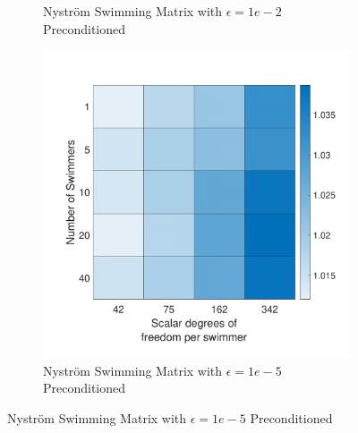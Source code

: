 \begin{figure}
\begin{subfigure}{0.3\textwidth}
        \caption{Nyström Swimming Matrix with $\epsilon=1e-2$ Preconditioned}
    \end{subfigure}
    \begin{subfigure}{0.3\textwidth}
        \includegraphics[width=\linewidth]{Images/Condition/Mobility Matrix Preconditioned-5.pdf}
        \caption{Nyström Swimming Matrix with $\epsilon=1e-5$ Preconditioned}
    \end{subfigure}
\end{figure}

